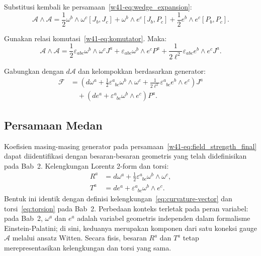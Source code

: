 \noindent Substitusi kembali ke persamaan~\eqref{w41-eq:wedge_expansion}:
\begin{equation}
    \mathcal{A} \wedge \mathcal{A} = \frac{1}{2} \omega^b \wedge \omega^c [J_b, J_c] + \omega^b \wedge e^c [J_b, P_c] + \frac{1}{2} e^b \wedge e^c [P_b, P_c].
\end{equation}
 
\noindent Gunakan relasi komutasi~\eqref{w41-eq:komutator}. Maka:
\begin{equation}
    \mathcal{A} \wedge \mathcal{A} = \frac{1}{2} \varepsilon_{abc} \omega^b \wedge \omega^c J^a + \varepsilon_{abc} \omega^b \wedge e^c P^a + \frac{1}{2 \ell^2} \varepsilon_{abc} e^b \wedge e^c J^a.
\end{equation}
 
\noindent Gabungkan dengan $d \mathcal{A}$ dan kelompokkan berdasarkan generator:
\begin{align}
    \mathcal{F} &= \left( d\omega^a + \frac{1}{2} \varepsilon^a_{\phantom{a}bc} \omega^b \wedge \omega^c + \frac{1}{2 \ell^2} \varepsilon^a_{\phantom{a}bc} e^b \wedge e^c \right) J^a \nonumber \\
    &\quad + \left( d e^a + \varepsilon^a_{\phantom{a}bc} \omega^b \wedge e^c \right) P^a. \label{w41-eq:field_strength_final}
\end{align}
 
\subsection{Persamaan Medan}
 
\noindent Koefisien masing-masing generator pada persamaan~\eqref{w41-eq:field_strength_final} dapat diidentifikasi dengan besaran-besaran geometris yang telah didefinisikan pada Bab~2. Kelengkungan Lorentz 2-form dan torsi:
\begin{align}
    R^a &= d\omega^a + \frac{1}{2}\varepsilon^a_{\phantom{a}bc} \omega^b \wedge \omega^c, \\
    T^a &= d e^a + \varepsilon^a_{\phantom{a}bc} \omega^b \wedge e^c.
\end{align}
Bentuk ini identik dengan definisi kelengkungan~\eqref{eq:curvature-vector} dan torsi~\eqref{eq:torsion} pada Bab~2. Perbedaan konteks terletak pada peran variabel: pada Bab~2, $\omega^a$ dan $e^a$ adalah variabel geometris independen dalam formalisme Einstein-Palatini; di sini, keduanya merupakan komponen dari satu koneksi gauge $\mathcal{A}$ melalui ansatz Witten. Secara fisis, besaran $R^a$ dan $T^a$ tetap merepresentasikan kelengkungan dan torsi yang sama.
 
